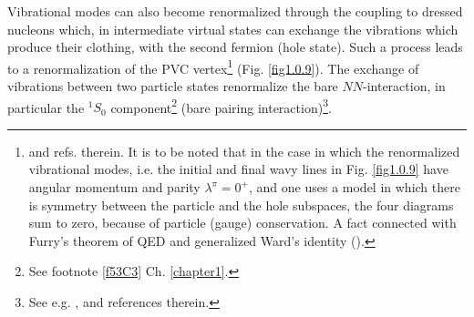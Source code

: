 Vibrational modes can also become renormalized through the coupling to dressed nucleons which, in intermediate virtual states can exchange the vibrations which produce their clothing, with the second fermion (hole state). Such a process leads to a renormalization of the PVC vertex\footnote{\label{footnote7} \cite{Bertsch:83,Barranco:04} and refs. therein. It is to be noted that in the case in which the renormalized vibrational modes, i.e. the initial and final wavy lines in Fig. \ref{fig1.0.9} have angular momentum and parity $\lambda^\pi=0^+$, and one uses a model in which there is symmetry between the particle and the hole subspaces, the four diagrams sum to zero, because of particle (gauge) conservation. A fact  connected with Furry's theorem of QED and generalized Ward's identity (\cite{Ward:50}).} (Fig. \ref{fig1.0.9}). The exchange of vibrations between two particle states renormalize   the bare $NN$-interaction, in particular the $^1S_0$ component\footnote{See footnote \ref{f53C3} Ch. \ref{chapter1}.} (bare pairing interaction)\footnote{\label{f9}See e.g. \cite{Duguet:13,Duguet:04,Duguet:08,Lesinski:09,Hebeler:09,Hergert:09,Baroni:10,Duguet:10,Lesinski:11}, and references therein.}. 

